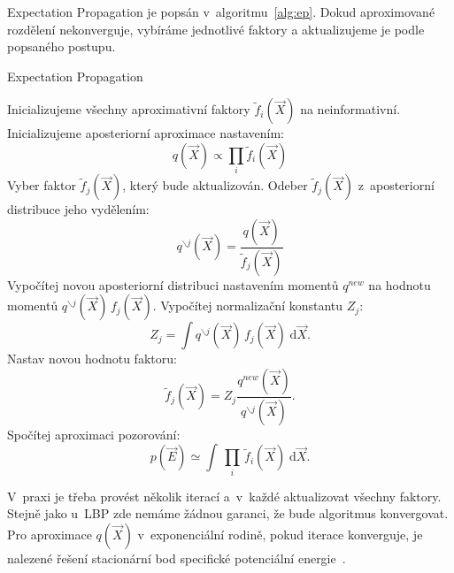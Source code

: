 Expectation Propagation je popsán v~algoritmu~\ref{alg:ep}.
Dokud aproximované rozdělení nekonverguje, vybíráme jednotlivé faktory a aktualizujeme je podle popsaného postupu.

\begin{algorithm}
\caption{Expectation Propagation}
\label{alg:ep}
\begin{algorithmic}
\State Inicializujeme všechny aproximativní faktory $\tilde{f}_i(\vec{X})$ na neinformativní.
\State Inicializujeme aposteriorní aproximace nastavením: $$q(\vec{X}) \propto \prod_i \tilde{f}_i(\vec{X})$$
\Repeat
    \State Vyber faktor $\tilde{f}_j(\vec{X})$, který bude aktualizován.
    \State Odeber $\tilde{f}_j(\vec{X})$ z~aposteriorní distribuce jeho vydělením: $$q^{\backslash j} (\vec{X}) = \frac{q(\vec{X})}{\tilde{f}_j(\vec{X})}$$
    \State Vypočítej novou aposteriorní distribuci nastavením momentů $q^{new}$ 
    \State na hodnotu momentů $q^{\backslash j}(\vec{X}) \, f_j(\vec{X})$.
    \State Vypočítej normalizační konstantu $Z_j$: $$Z_j = \int q^{\backslash j}(\vec{X}) \, f_j(\vec{X}) \; \mathrm{d}\vec{X}.$$
    \State Nastav novou hodnotu faktoru: $$\tilde{f}_j(\vec{X}) = Z_j \frac{q^{new}(\vec{X})}{q^{\backslash j}(\vec{X})}.$$
\State Spočítej aproximaci pozorování: $$p(\vec{E}) \simeq \int \, \prod_i \, \tilde{f}_i(\vec{X}) \; \mathrm{d}\vec{X}.$$
\end{algorithmic}
\end{algorithm}

V~praxi je třeba provést několik iterací a~v~každé aktualizovat všechny faktory.
Stejně jako u~LBP zde nemáme žádnou garanci, že bude algoritmus konvergovat.
Pro aproximace $q(\vec{X})$ v~exponenciální rodině, pokud iterace konverguje, je nalezené řešení stacionární bod specifické potenciální energie~\cite{minka2001expectation}.
